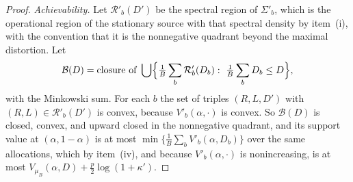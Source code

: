 \documentclass[11pt,onecolumn]{IEEEtran}
\begin{document}
\begin{proof}
\emph{Achievability.} Let $\mathcal R'_b(D')$ be the spectral region of
$\Sigma'_b$, which is the operational region of the stationary source
with that spectral density by item~(i), with the convention that it
is the nonnegative quadrant beyond the maximal distortion. Let
\[
\mathcal B(D)=\text{closure of }\bigcup\Bigl\{\tfrac1B\sum_b\mathcal R'_b(D_b):\ \tfrac1B\sum_bD_b\le D\Bigr\},
\]
with the Minkowski sum. For each $b$ the set of triples $(R,L,D')$
with $(R,L)\in\mathcal R'_b(D')$ is convex, because $V'_b(\alpha,\cdot)$
is convex. So $\mathcal B(D)$ is closed, convex, and upward closed in
the nonnegative quadrant, and its support value at $(\alpha,1-\alpha)$
is at most $\min\{\tfrac1B\sum_bV'_b(\alpha,D_b)\}$ over the same
allocations, which by item~(iv), and because $V'_b(\alpha,\cdot)$ is
nonincreasing, is at most $V_{\mu_B}(\alpha,D)+\tfrac p2\log(1+\kappa')$.


\end{proof}
\end{document}
